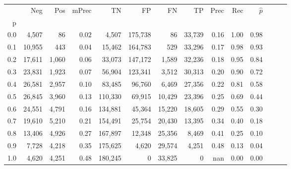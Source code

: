 \begin{tabular}{rrrrrrrrrrrrrr}
\toprule
{} &     Neg &    Pos & mPrec &       TN &       FP &      FN &      TP &  Prec &   Rec & $\hat{p}$ \\
p   &         &        &       &          &          &         &         &       &       &           \\
\midrule
0.0 &   4,507 &     86 &  0.02 &    4,507 &  175,738 &      86 &  33,739 &  0.16 &  1.00 &      0.98 \\
0.1 &  10,955 &    443 &  0.04 &   15,462 &  164,783 &     529 &  33,296 &  0.17 &  0.98 &      0.93 \\
0.2 &  17,611 &  1,060 &  0.06 &   33,073 &  147,172 &   1,589 &  32,236 &  0.18 &  0.95 &      0.84 \\
0.3 &  23,831 &  1,923 &  0.07 &   56,904 &  123,341 &   3,512 &  30,313 &  0.20 &  0.90 &      0.72 \\
0.4 &  26,581 &  2,957 &  0.10 &   83,485 &   96,760 &   6,469 &  27,356 &  0.22 &  0.81 &      0.58 \\
0.5 &  26,845 &  3,960 &  0.13 &  110,330 &   69,915 &  10,429 &  23,396 &  0.25 &  0.69 &      0.44 \\
0.6 &  24,551 &  4,791 &  0.16 &  134,881 &   45,364 &  15,220 &  18,605 &  0.29 &  0.55 &      0.30 \\
0.7 &  19,610 &  5,210 &  0.21 &  154,491 &   25,754 &  20,430 &  13,395 &  0.34 &  0.40 &      0.18 \\
0.8 &  13,406 &  4,926 &  0.27 &  167,897 &   12,348 &  25,356 &   8,469 &  0.41 &  0.25 &      0.10 \\
0.9 &   7,728 &  4,218 &  0.35 &  175,625 &    4,620 &  29,574 &   4,251 &  0.48 &  0.13 &      0.04 \\
1.0 &   4,620 &  4,251 &  0.48 &  180,245 &        0 &  33,825 &       0 &   nan &  0.00 &      0.00 \\
\bottomrule
\end{tabular}
